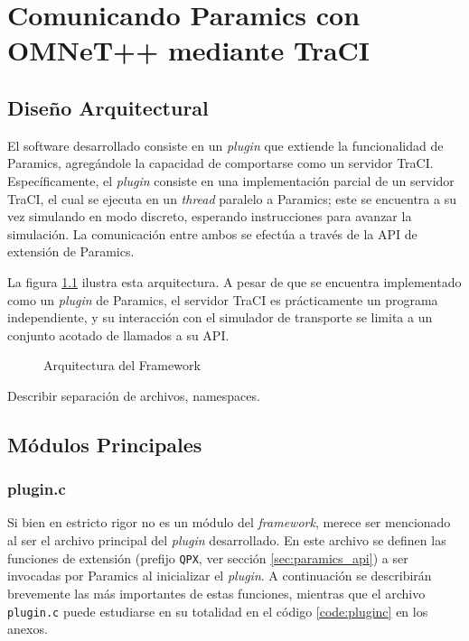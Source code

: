 \chapter{Comunicando Paramics con OMNeT++ mediante TraCI}
\section{Diseño Arquitectural}\label{sec:architecture}

El software desarrollado consiste en un \emph{plugin} que extiende la funcionalidad de Paramics, agregándole la capacidad de comportarse como un servidor TraCI. Específicamente, el \emph{plugin} consiste en una implementación parcial de un servidor TraCI, el cual se ejecuta en un \emph{thread} paralelo a Paramics; este se encuentra a su vez simulando en modo discreto, esperando instrucciones para avanzar la simulación. La comunicación entre ambos se efectúa a través de la API de extensión de Paramics.

La figura \ref{fig:ptraci_arch} ilustra esta arquitectura. A pesar de que se encuentra implementado como un \emph{plugin} de Paramics, el servidor TraCI es prácticamente un programa independiente, y su interacción con el simulador de transporte se limita a un conjunto acotado de llamados a su API.

\begin{figure}[t]
    \centering
    
    \caption{Arquitectura del Framework}
    \label{fig:ptraci_arch}
\end{figure}

Describir separación de archivos, namespaces.

\section{Módulos Principales}
\subsection{plugin.c}

Si bien en estricto rigor no es un módulo del \emph{framework}, merece ser mencionado al ser el archivo principal del \emph{plugin} desarrollado. En este archivo se definen las funciones de extensión (prefijo \texttt{QPX}, ver sección \ref{sec:paramics_api}) a ser invocadas por Paramics al inicializar el \emph{plugin}. A continuación se describirán brevemente las más importantes de estas funciones, mientras que el archivo \texttt{plugin.c} puede estudiarse en su totalidad en el código \ref{code:pluginc} en los anexos.


